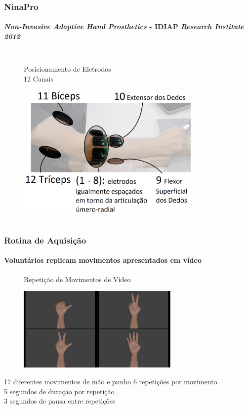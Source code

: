 \documentclass{beamer}
\begin{document}
	\begin{frame}
		\frametitle{NinaPro}
		\framesubtitle{\emph{Non-Invasive Adaptive Hand Prosthetics} - IDIAP \emph{Research Institute 2012}}
		\begin{columns}[c]
			\column{\textwidth}
				\begin{figure}
					Posicionamento de Eletrodos \\ 12 Canais
					\begin{center}
						\includegraphics[width=0.8\textwidth]{./img/eletrodos.png}
					\end{center}
				\end{figure}
		\end{columns}
	\end{frame}
	
	\begin{frame}
		\frametitle{Rotina de Aquisição}
		\framesubtitle{Voluntários replicam movimentos apresentados em vídeo}
		\begin{figure}
			Repetição de Movimentos de Vídeo
			\begin{center}
				\includegraphics[width=0.7\textwidth]{./img/scenes.png}
			\end{center}
		\end{figure}
		\begin{alertblock}{17 diferentes movimentos de mão e punho}
			6 repetições por movimento \\
			5 segundos de duração por repetição \\
			3 segundos de pausa entre repetições
		\end{alertblock}
	\end{frame}
	
\end{document}
